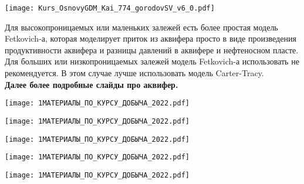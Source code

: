 \texttt{[image: Kurs\_OsnovyGDM\_Kai\_774\_gorodovSV\_v6\_0.pdf]}

Для высокопроницаемых или маленьких залежей есть более простая модель Fetkovich-а, которая моделирует приток из аквифера просто в виде произведения продуктивности аквифера и разницы давлений в аквифере и нефтеносном пласте.
\\

Для больших или низкопроницаемых залежей модель Fetkovich-а использовать не рекомендуется. В этом случае лучше использовать модель Carter-Tracy.
\\

\textbf{Далее более подробные слайды про аквифер.}

\texttt{[image: 1МАТЕРИАЛЫ\_ПО\_КУРСУ\_ДОБЫЧА\_2022.pdf]}

\texttt{[image: 1МАТЕРИАЛЫ\_ПО\_КУРСУ\_ДОБЫЧА\_2022.pdf]}

\texttt{[image: 1МАТЕРИАЛЫ\_ПО\_КУРСУ\_ДОБЫЧА\_2022.pdf]}

\texttt{[image: 1МАТЕРИАЛЫ\_ПО\_КУРСУ\_ДОБЫЧА\_2022.pdf]}

\texttt{[image: 1МАТЕРИАЛЫ\_ПО\_КУРСУ\_ДОБЫЧА\_2022.pdf]}


